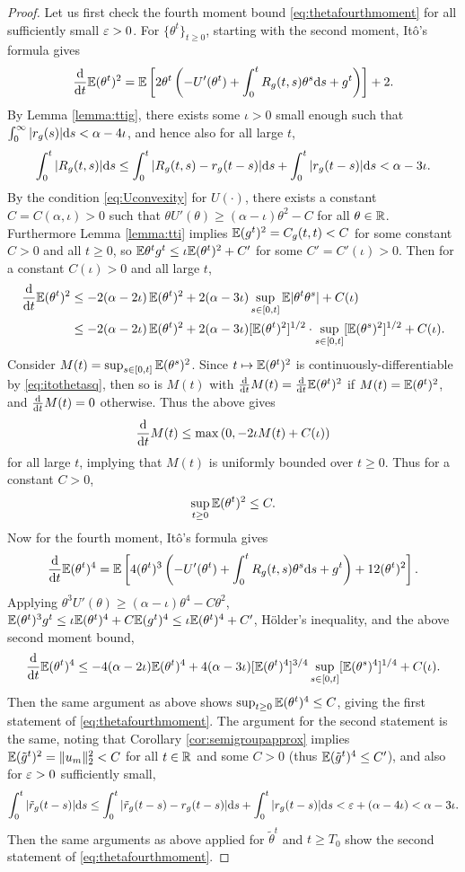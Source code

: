 \begin{proof}
Let us first check the fourth moment
bound \eqref{eq:thetafourthmoment} for all sufficiently small
$\varepsilon>0$. For $\{\theta^t\}_{t \geq 0}$,
starting with the second moment, It\^o's formula gives
\begin{equation}\label{eq:itothetasq}
\frac{\mathrm{d}}{\mathrm{d} t}\mathbb{E}(\theta^t)^2=
\mathbb{E}\left[2\theta^t\left(-U'(\theta^t)+\int_0^t R_g(t,s)\theta^s \mathrm{d}
s+g^t\right)\right]+2.
\end{equation}
By Lemma \ref{lemma:ttig}, there exists some $\iota>0$ small enough
such that $\int_0^\infty |r_g(s)|\mathrm{d} s<\alpha-4\iota$, and hence also for all
large $t$,
\[\int_0^t |R_g(t,s)|\mathrm{d} s
\leq \int_0^t |R_g(t,s)-r_g(t-s)|\mathrm{d} s+\int_0^t |r_g(t-s)|\mathrm{d} s
<\alpha-3\iota.\]
By the condition \eqref{eq:Uconvexity} for $U(\cdot)$, there exists a
constant $C=C(\alpha,\iota)>0$ such that $\theta U'(\theta) \geq (\alpha-\iota)
\theta^2-C$ for all $\theta \in \mathbb{R}$.
Furthermore Lemma \ref{lemma:tti} implies $\mathbb{E}(g^t)^2=C_g(t,t)<C$
for some constant $C>0$ and all $t \geq 0$,
so $\mathbb{E}\theta^t g^t \leq \iota \mathbb{E}(\theta^t)^2+C'$ for some
$C'=C'(\iota)>0$.
Then for a constant $C(\iota)>0$ and all large $t$,
\begin{align*}
\frac{\mathrm{d}}{\mathrm{d} t}\mathbb{E}(\theta^t)^2
&\leq -2(\alpha-2\iota)\,\mathbb{E}(\theta^t)^2
+2(\alpha-3\iota)\sup_{s \in [0,t]} \mathbb{E}|\theta^t\theta^s|+C(\iota)\\
&\leq -2(\alpha-2\iota)\,\mathbb{E}(\theta^t)^2
+2(\alpha-3\iota)[\mathbb{E}(\theta^t)^2]^{1/2} \cdot \sup_{s \in [0,t]}
[\mathbb{E}(\theta^s)^2]^{1/2}+C(\iota).
\end{align*}
Consider $M(t)=\sup_{s \in [0,t]} \mathbb{E}(\theta^s)^2$. Since
$t \mapsto \mathbb{E}(\theta^t)^2$ is continuously-differentiable by
\eqref{eq:itothetasq}, then so is $M(t)$
with $\frac{\mathrm{d}}{\mathrm{d} t}M(t)=\frac{\mathrm{d}}{\mathrm{d} t} \mathbb{E}(\theta^t)^2$ if
$M(t)=\mathbb{E}(\theta^t)^2$, and $\frac{\mathrm{d}}{\mathrm{d} t}M(t)=0$ otherwise. Thus the above
gives
\[\frac{\mathrm{d}}{\mathrm{d} t}M(t)
\leq \max\left(0,{-}2\iota M(t)+C(\iota)\right)\]
for all large $t$, implying that $M(t)$ is uniformly bounded over $t \geq 0$.
Thus for a constant $C>0$,
\[\sup_{t \geq 0} \mathbb{E}(\theta^t)^2 \leq C.\]
Now for the fourth moment, It\^o's formula gives
\[\frac{\mathrm{d}}{\mathrm{d} t}\mathbb{E}(\theta^t)^4
=\mathbb{E}\left[4(\theta^t)^3\left({-}U'(\theta^t)+\int_0^t R_g(t,s)\theta^s \mathrm{d} s
+g^t\right)+12(\theta^t)^2\right].\]
Applying $\theta^3 U'(\theta) \geq (\alpha-\iota) \theta^4-C\theta^2$,
$\mathbb{E}(\theta^t)^3g^t
\leq \iota \mathbb{E}(\theta^t)^4+C\mathbb{E}(g^t)^4 \leq \iota \mathbb{E}(\theta^t)^4+C'$, H\"older's
inequality, and the above second moment bound,
\[\frac{\mathrm{d}}{\mathrm{d} t}\mathbb{E}(\theta^t)^4
\leq -4(\alpha-2\iota)\mathbb{E}(\theta^t)^4+4(\alpha-3\iota)[\mathbb{E}(\theta^t)^4]^{3/4}
\sup_{s \in [0,t]} [\mathbb{E}(\theta^s)^4]^{1/4}+C(\iota).\]
Then the same argument as above shows $\sup_{t \geq 0} \mathbb{E}(\theta^t)^4 \leq C$,
giving the first statement of \eqref{eq:thetafourthmoment}. The argument for
the second statement is the same, noting that
Corollary \ref{cor:semigroupapprox} implies
$\mathbb{E}(\tilde g^t)^2=\|u_m\|_2^2<C$ for all $t \in \mathbb{R}$ and some $C>0$ 
(thus $\mathbb{E}(\tilde g^t)^4 \leq C'$), and also for $\varepsilon>0$ sufficiently small,
\[\int_0^t |\tilde r_g(t-s)|\mathrm{d} s
\leq \int_0^t |\tilde r_g(t-s)-r_g(t-s)|\mathrm{d} s
+\int_0^t |r_g(t-s)|\mathrm{d} s<\varepsilon+(\alpha-4\iota)<\alpha-3\iota.\]
Then the same arguments as above applied for $\tilde\theta^t$ and
$t \geq T_0$ show the second statement of \eqref{eq:thetafourthmoment}.


\end{proof}
